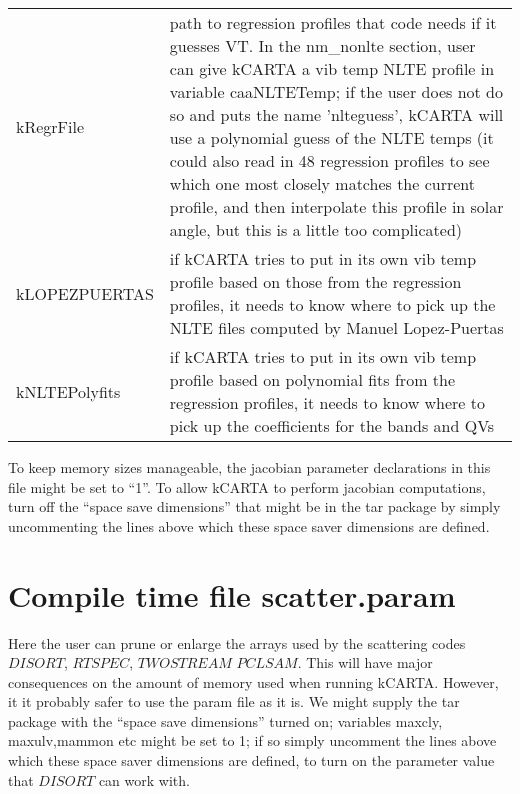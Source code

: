 \documentclass[12pt]{article}
\newcommand{\kc}{\textsf{kCARTA}\xspace}
\newlength{\colwidth}
\begin{document}
\begin{longtable}{|l|p{\colwidth}|}
kRegrFile & path to regression profiles that code needs if it guesses VT.
            In the nm\_nonlte section, user can give kCARTA a vib temp NLTE
            profile in variable caaNLTETemp; if the user does not do so and
            puts the name 'nlteguess', kCARTA will use a polynomial guess
            of the NLTE temps (it could also read in 48 regression profiles 
            to see which one most closely matches the current profile, and 
            then interpolate this profile in solar angle, but this is 
            a little too complicated)\\
kLOPEZPUERTAS & if kCARTA tries to put in its own vib temp profile based on 
               those from the regression profiles, it needs to know where to 
               pick up the NLTE files computed by Manuel Lopez-Puertas\\
kNLTEPolyfits & if kCARTA tries to put in its own vib temp profile based on 
               polynomial fits from the regression profiles, it needs to know 
               where to pick up the coefficients for the bands and QVs \\
               \hline
\end{longtable}

To keep memory sizes manageable, the jacobian parameter declarations in this
file might be set to ``1''. To allow \kc to perform jacobian computations, 
turn off the ``space save dimensions'' that might be in the tar package by  
simply uncommenting the lines above which these space saver dimensions are 
defined.

\section{Compile time file {\sf scatter.param}}
Here the user can prune or enlarge the arrays used by the scattering codes 
$DISORT$, $RTSPEC$, $TWOSTREAM$ $PCLSAM$. This will have major consequences on
the amount of memory used when
running \kc. However, it it probably safer to use the param file as it is. We
might supply the tar package with the ``space save dimensions'' turned on; 
variables maxcly, maxulv,mammon etc might be set to 1; if so simply uncomment
the lines above which these space saver dimensions are defined, to turn on
the parameter value that $DISORT$ can work with.
\end{document}
